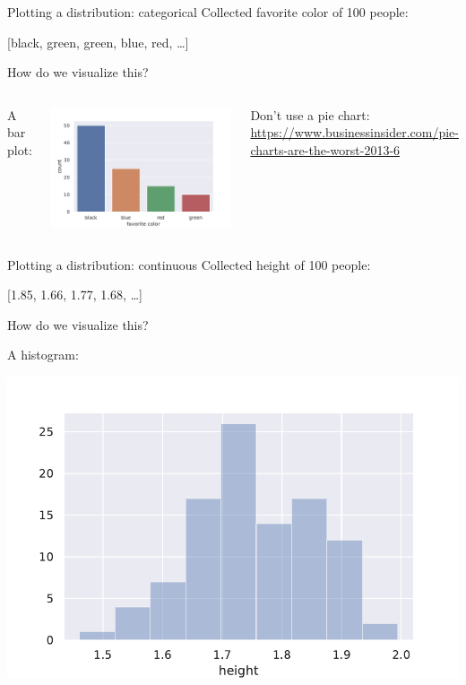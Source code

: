 \documentclass[aspectratio=169,usenames,dvipsnames]{beamer}
\begin{document}
\begin{frame}{Plotting a distribution: categorical}
Collected favorite color of 100 people:

[black, green, green, blue, red, \dots ]

\vspace{1em}
How do we visualize this?

\pause\vspace{1em}
\begin{columns}
A bar plot:

\includegraphics[height=0.55\textheight]{fig/barplot}

Don't use a pie chart: \url{https://www.businessinsider.com/pie-charts-are-the-worst-2013-6}
\end{columns}
\end{frame}


\begin{frame}{Plotting a distribution: continuous}
Collected height of 100 people:

[1.85, 1.66, 1.77, 1.68, \dots]

\vspace{1em}
How do we visualize this?

\pause
A histogram:

\includegraphics[height=0.55\textheight]{fig/histogram}
\end{frame}
\end{document}
